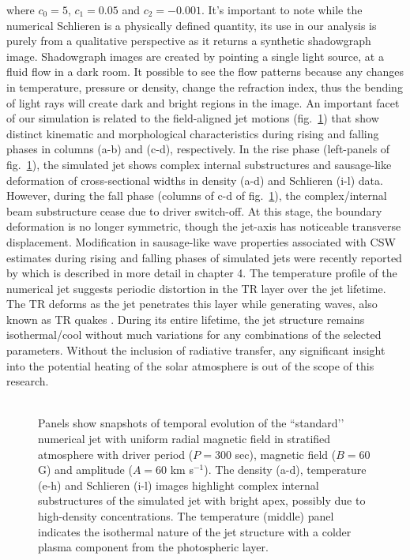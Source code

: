 \documentclass[12pt]{ociamthesis}
\newcommand{\np}{\\ \\}
\begin{document}
where $c_0=5$, $c_1=0.05$ and $c_2=-0.001$. It's important to note while the numerical Schlieren is a physically defined quantity, its use in our analysis is purely from a qualitative perspective as it returns a synthetic shadowgraph image. Shadowgraph images are created by pointing a single light source, at a fluid flow in a dark room. It possible to see the flow patterns because any changes in temperature, pressure or density, change the refraction index, thus the bending of light rays will create dark and bright regions in the image. An important facet of our simulation is related to the field-aligned jet motions (fig.~\ref{standard_jet}) that show distinct kinematic and morphological characteristics during rising and falling phases in columns (a-b) and (c-d), respectively. In the rise phase (left-panels of fig.~\ref{standard_jet}), the simulated jet shows complex internal substructures and sausage-like deformation of cross-sectional widths in density (a-d) and Schlieren (i-l) data. However, during the fall phase (columns of c-d of fig.~\ref{standard_jet}), the complex/internal beam substructure cease due to driver switch-off. At this stage, the boundary deformation is no longer symmetric, though the jet-axis has noticeable transverse displacement. Modification in sausage-like wave properties associated with CSW estimates during rising and falling phases of simulated jets were recently reported by \cite{Dover2020ApJ90572D} which is described in more detail in chapter 4. The temperature profile of the numerical jet suggests periodic distortion in the TR layer over the jet lifetime. The TR deforms as the jet penetrates this layer while generating waves, also known as TR quakes \citep{Scullion2011ApJ74314S}. During its entire lifetime, the jet structure remains isothermal/cool without much variations for any combinations of the selected parameters. Without the inclusion of radiative transfer, any significant insight into the potential heating of the solar atmosphere is out of the scope of this research. \np
\begin{figure}
\captionsetup[subfigure]{labelformat=empty}
\centering
{}
\caption{Panels show snapshots of temporal evolution of the ``standard’’ numerical jet with uniform radial magnetic field in stratified atmosphere with driver period ($P = 300$ sec), magnetic field ($B = 60$ G) and amplitude ($A = 60$ km s$^{-1}$). The density (a-d), temperature (e-h) and Schlieren (i-l) images highlight complex internal substructures of the simulated jet with bright apex, possibly due to high-density concentrations. The temperature (middle) panel indicates the isothermal nature of the jet structure with a colder plasma component from the photospheric layer.}
\label{standard_jet}
\end{figure}
\end{document}
